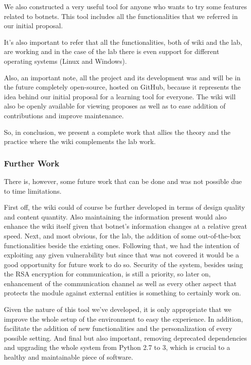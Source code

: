 \documentclass[]{article}
\begin{document}
We also constructed a very useful tool for anyone who wants to try some features related to botnets. This tool includes all the functionalities that we referred in our initial proposal.

It's also important to refer that all the functionalities, both of wiki and the lab, are working and in the case of the lab there is even support for different operating systems (Linux and Windows).

Also, an important note, all the project and its development was and will be in the future completely open-source, hosted on GitHub, because it represents the idea behind our initial proposal for a learning tool for everyone. The wiki will also be openly available for viewing proposes as well as to ease addition of contributions and improve maintenance.

So, in conclusion, we present a complete work that allies the theory and the practice where the wiki complements the lab work.


\subsubsection{Further Work}

There is, however, some future work that can be done and was not possible due to time limitations.

First off, the wiki could of course be further developed in terms of design quality and content quantity. Also maintaining the information present would also enhance the wiki itself given that botnet’s information changes at a relative great speed.
Next, and most obvious, for the lab, the addition of some out-of-the-box functionalities beside the existing ones. Following that, we had the intention of exploiting any given vulnerability but since that was not covered it would be a good opportunity for future work to do so.
Security of the system, besides using the RSA encryption for communication, is still a priority, so later on, enhancement of the communication channel as well as every other aspect that protects the module against external entities is something to certainly work on.

Given the nature of this tool we’ve developed, it is only appropriate that we improve the whole setup of the environment to easy the experience. In addition, facilitate the addition of new functionalities and the personalization of every possible setting. And final but also important, removing deprecated dependencies and upgrading the whole system from Python 2.7 to 3, which is crucial to a healthy and maintainable piece of software.

\newpage


 
 
\end{document}
